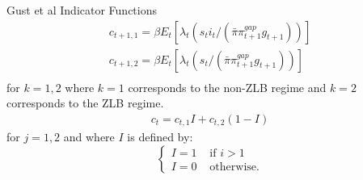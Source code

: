 \documentclass[12pt, final]{article}
\begin{document}
\setcounter{equation}{0}
\noindent Gust et al Indicator Functions\\
\begin{gather}
  c_{t+1,1} = \beta E_t[\lambda_t(s_ti_t/(\bar{\pi}\pi_{t+1}^{gap}g_{t+1}))]\\
  c_{t+1,2} = \beta E_t[\lambda_t(s_t/(\bar{\pi}\pi_{t+1}^{gap}g_{t+1}))]\\  
\end{gather}
for $k=1,2$ where $k=1$ corresponds to the non-ZLB regime and $k=2$ corresponds to the ZLB regime.
\begin{gather}
c_{t} = c_{t,1}I + c_{t,2}(1-I) 
\end{gather}
for $j=1,2$ and where $I$ is defined by:
$$
\begin{cases}
  I = 1 & \text{ if } i > 1\\
  I = 0 & \text{ otherwise.}
\end{cases}
$$
\end{document}
